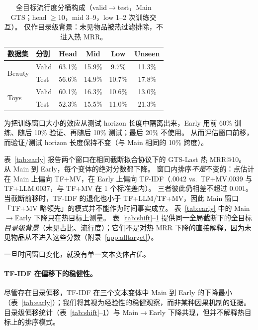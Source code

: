 \documentclass[sigconf,natbib=true,anonymous]{acmart}
\newcommand{\tfidf}{\textsc{TF-IDF}\xspace}
\newcommand{\tfllm}{\textsc{TF+LLM}\xspace}
\newcommand{\tfmv}{\textsc{TF+MV}\xspace}
\begin{document}
\begin{table}[t]
\centering
\caption{%
全目标流行度分桶构成（valid$\to$test，Main GTS；head $\ge$10，mid 3--9，low 1--2 次训练交互）。
仅作目录级背景：未见物品被热过滤排除，不进入热 MRR。%
}
\label{tab:bucket}
\small
\setlength{\tabcolsep}{3.5pt}
\begin{tabular}{@{}llcccc@{}}
\toprule
数据集 & 分割 & Head & Mid & Low & Unseen \\
\midrule
\multirow{2}{*}{Beauty}
 & Valid & 63.1\% & 15.9\% & 9.7\% & 11.3\% \\
 & Test  & 56.6\% & 14.9\% & 10.7\% & 17.8\% \\
\midrule
\multirow{2}{*}{Toys}
 & Valid & 60.1\% & 16.3\% & 10.6\% & 13.0\% \\
 & Test  & 52.3\% & 15.5\% & 11.0\% & 21.3\% \\
\bottomrule
\end{tabular}
\end{table}

为把训练窗口大小的效应从测试 horizon 长度中隔离出来，Early 用前 60\% 训练、随后 10\% 验证、再随后 10\% 测试；最后 20\% 不使用。
从而评估窗口前移，而验证/测试 horizon 长度保持不变（与 Main 相同的 10\% 跨度）。

表~\ref{tab:early} 报告两个窗口在相同截断拟合协议下的 GTS-Last 热 MRR@10。
从 Main 到 Early，每个变体的绝对分数都下降。
窗口内排序\emph{不是}不变的：点估计在 Main 上偏向 \tfmv，在 Early 上偏向 \tfidf（$.0042$ vs.\ \tfmv $.0039$ 与 \tfllm $.0037$，与 \tfmv 在 1 个标准差内）。
三者彼此仍相差不超过 $0.001$。
当截断前移时，\tfidf 的退化也小于 \tfllm/\tfmv，因此 Main 窗口「\tfmv 略领先」的模式并不能作为时间事实成立。
表~\ref{tab:early} 中的 Main$\to$Early 下降只在热目标上测量。
表~\ref{tab:shift}--\ref{tab:bucket} 提供同一全局截断下的全目标\emph{目录级背景}（未见占比、流行度）；它们不是对热 MRR 下降的直接解释，因为未见物品从不进入这些分数（附录~\ref{app:alltarget}）。

一旦时间窗口变化，就没有单一文本变体占优。

\paragraph{TF-IDF 在偏移下的稳健性。}
尽管存在目录偏移，\tfidf 在三个文本变体中 Main 到 Early 的下降最小（表~\ref{tab:early}）；我们将其视为经验性的稳健观察，而非某种因果机制的证据。
目录级偏移统计（表~\ref{tab:shift}--\ref{tab:bucket}）与 Main$\to$Early 下降共现，但并不解释热目标上的排序模式。

\end{document}
